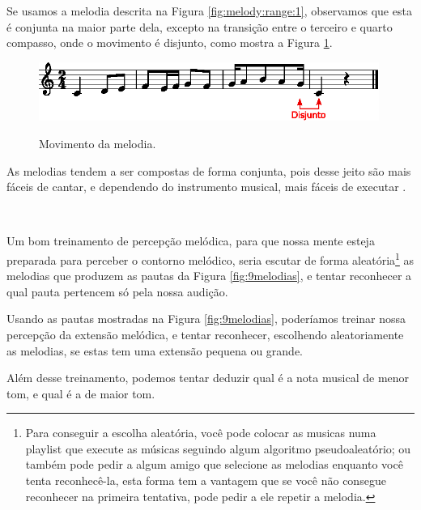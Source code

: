\begin{description}
\begin{example}
Se usamos a melodia descrita na Figura \ref{fig:melody:range:1},
observamos que esta é conjunta na maior parte dela,
excepto na transição entre o terceiro e quarto compasso,
onde o movimento é disjunto,
como mostra a Figura \ref{fig:melody:movement:1}.
\end{example}
\begin{figure}[!h]
\centering
\href{https://drive.google.com/file/d/1t-idPWPqz53dfPF7Fwtju9xmcIW7ucFw/view?usp=sharing}{\includegraphics[width=0.99\textwidth]{chapters/cap-musicalidade-percepcion/melodia-carateristicas-movement.eps}}
\caption{Movimento da melodia.}
\label{fig:melody:movement:1}
\end{figure}

As melodias tendem a ser compostas de forma conjunta, 
pois desse jeito são mais fáceis de cantar,
e dependendo do instrumento musical, mais fáceis de executar  
\cite[pp. 53]{langer2017theory}. 

\end{description}~




\begin{example}
Um bom treinamento de percepção melódica,
para que nossa mente esteja preparada para perceber o contorno melódico,
seria escutar de forma aleatória\footnote{Para conseguir a escolha aleatória,
você pode colocar as musicas numa playlist que execute as músicas 
seguindo algum algoritmo pseudoaleatório;
ou também pode pedir a algum amigo que selecione as melodias enquanto você tenta reconhecê-la,
esta forma tem a vantagem que se você não consegue reconhecer na primeira tentativa,
pode pedir a ele repetir a melodia.} 
as melodias que produzem as pautas da Figura \ref{fig:9melodias},
e tentar reconhecer a qual pauta pertencem só pela nossa audição.
\end{example}


\begin{example}
Usando as  pautas mostradas na Figura \ref{fig:9melodias},
poderíamos treinar nossa percepção da extensão melódica,
e tentar reconhecer, escolhendo aleatoriamente as melodias, 
se estas tem uma extensão pequena ou grande.

Além desse treinamento, podemos tentar deduzir qual é a nota musical de menor tom, 
e qual é a de maior tom.
\end{example}


